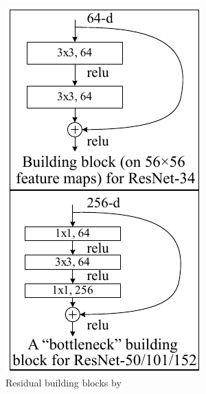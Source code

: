 \begin{minipage}[ht]{.32\textwidth}
    \begin{figure}[H]
        \centering
    \includegraphics[width=.99\textwidth]{literature/imgs/ext-CNN-ResNet-BBs.pdf}
    \caption{Residual building blocks by \citet{he2015deep}}
    \label{fig:ext-CNN-ResNet-BBs}
    \end{figure}
\end{minipage}

